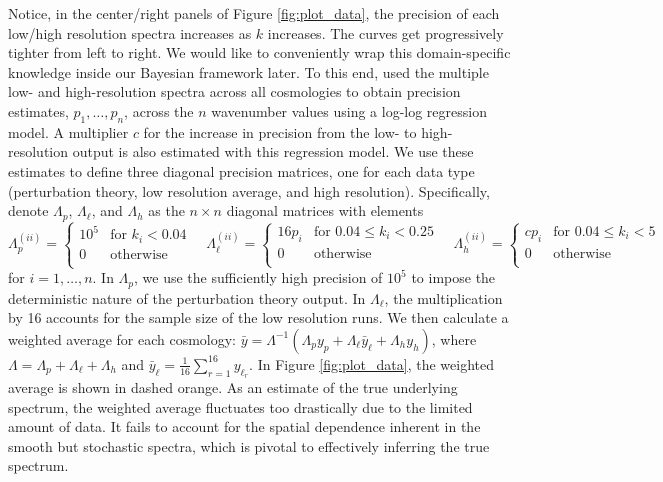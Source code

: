 \documentclass[11pt]{article}
\begin{document}
Notice, in the center/right panels of Figure \ref{fig:plot_data}, the precision of each
low/high resolution spectra increases as $k$ increases.  The curves get progressively 
tighter from left to right.  We would like to conveniently wrap this domain-specific 
knowledge inside our Bayesian framework later.  To this end, \cite{moran2023mira} 
used the multiple low- and high-resolution spectra across all cosmologies to
obtain precision estimates, $p_1,\dots, p_n$, across the $n$ 
wavenumber values using a log-log regression model. A multiplier $c$ for 
the increase in precision from the low- to high- resolution output is also 
estimated with this regression model. We use these estimates to define three 
diagonal precision matrices, one for each data type (perturbation theory, 
low resolution average, and high resolution). Specifically, denote $\Lambda_p$, 
$\Lambda_\ell$, and $\Lambda_h$ as the $n\times n$ diagonal matrices with elements
\[
\Lambda_p^{(ii)} = \begin{cases}
    10^5 &\text{for } k_i < 0.04 \\
    0  &\text{otherwise}\\
    \end{cases}
\quad
\Lambda_\ell^{(ii)} = \begin{cases}
    16p_i &\text{for } 0.04 \leq k_i < 0.25 \\
    0  &\text{otherwise}\\
    \end{cases}
\quad
\Lambda_h^{(ii)} = \begin{cases}
    cp_i &\text{for } 0.04 \leq k_i < 5 \\
    0  &\text{otherwise}\\
    \end{cases}
\]
for $i=1,\dots, n$.  In $\Lambda_p$, we use the sufficiently high precision 
of $10^5$ to impose the deterministic nature of the perturbation theory output.
In $\Lambda_\ell$, the multiplication by 16 accounts for the sample size of the
low resolution runs.
We then calculate a weighted average for each cosmology: 
$\bar y = \Lambda^{-1}(\Lambda_p y_p + \Lambda_{\ell} \bar{y}_\ell + \Lambda_h y_h)$, 
where $\Lambda = \Lambda_p + \Lambda_\ell + \Lambda_h$ and 
$\bar{y}_\ell = \frac{1}{16}\sum_{r=1}^{16} y_{\ell_r}$. In Figure \ref{fig:plot_data},
the weighted average is shown in dashed orange.  As an estimate of the true
underlying spectrum, the weighted average fluctuates too drastically due 
to the limited amount of data.  It fails to account for the
spatial dependence inherent in the smooth but stochastic spectra,
which is pivotal to effectively inferring the true spectrum.
\end{document}
